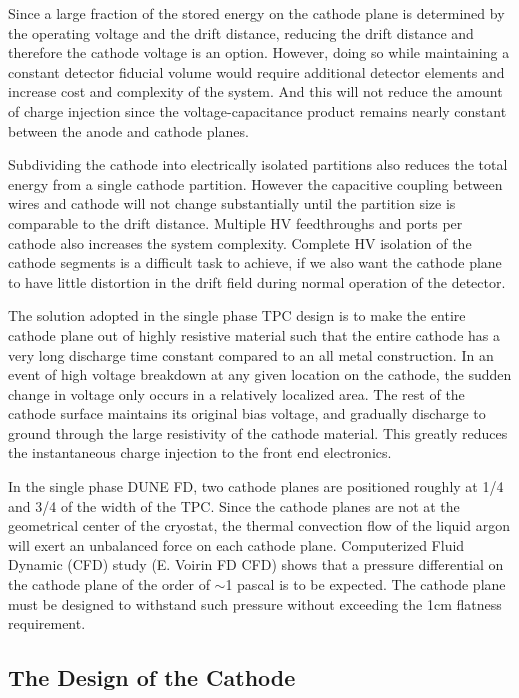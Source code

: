 Since  a large fraction of the stored energy on the cathode plane is determined by the operating voltage and the drift distance, reducing the drift distance and therefore the cathode voltage is an option.  However, doing so while maintaining a constant detector fiducial volume would require additional detector elements and increase cost and complexity of the system.  And this will not reduce the amount of charge injection since the voltage-capacitance product remains nearly constant between the anode and cathode planes.

Subdividing the cathode into electrically isolated partitions also reduces the total energy from a single cathode partition. However the capacitive coupling between wires and cathode will not change substantially until the partition size is comparable to the drift distance. Multiple HV feedthroughs and ports per cathode also increases the system complexity. Complete HV isolation of the cathode segments is a difficult task to achieve, if we also want the cathode plane to have little distortion in the drift field during normal operation of the detector. 

The solution adopted in the single phase TPC design is to make the entire cathode plane out of highly resistive material such that the entire cathode has a very long discharge time constant compared to an all metal construction.  In an event of high voltage breakdown at any given location on the cathode, the sudden change in voltage only occurs in a relatively localized area.  The rest of the cathode surface maintains its original bias voltage, and gradually discharge to ground through the large resistivity of the cathode material.  This greatly reduces the instantaneous charge injection to the front end electronics.

In the single phase DUNE FD, two cathode planes are positioned roughly at 1/4 and 3/4 of the width of the TPC.  Since the cathode planes are not at the geometrical center of the cryostat, the thermal convection flow of the liquid argon will exert an unbalanced force on each cathode plane. Computerized Fluid Dynamic (CFD) study (E. Voirin FD CFD) shows that a pressure differential on the cathode plane of the order of $\sim$1 pascal is to be expected.  The cathode plane must be designed to withstand such pressure without exceeding the 1cm flatness requirement.




\subsection{The Design of the Cathode}

